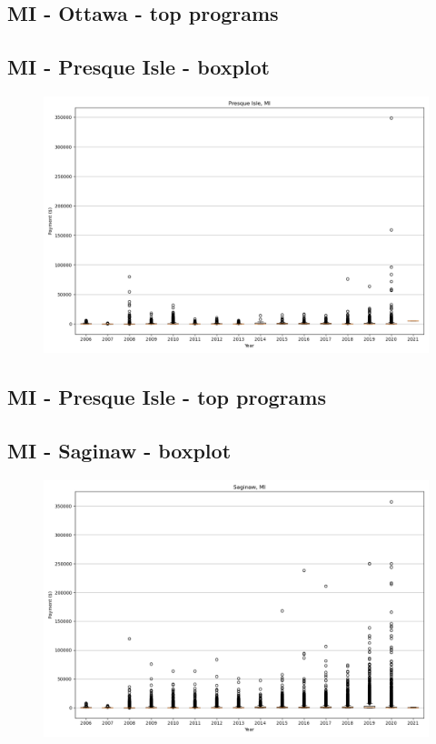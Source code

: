 \subsection*{MI - Ottawa - top programs}

\newpage
\subsection*{MI - Presque Isle - boxplot}
\begin{figure}[h]
\centering
\includegraphics[width=7in]{../output/boxplots/counties/Presque Isle-MI_boxplot.png}
\end{figure}


\subsection*{MI - Presque Isle - top programs}

\newpage
\subsection*{MI - Saginaw - boxplot}
\begin{figure}[h]
\centering
\includegraphics[width=7in]{../output/boxplots/counties/Saginaw-MI_boxplot.png}
\end{figure}


